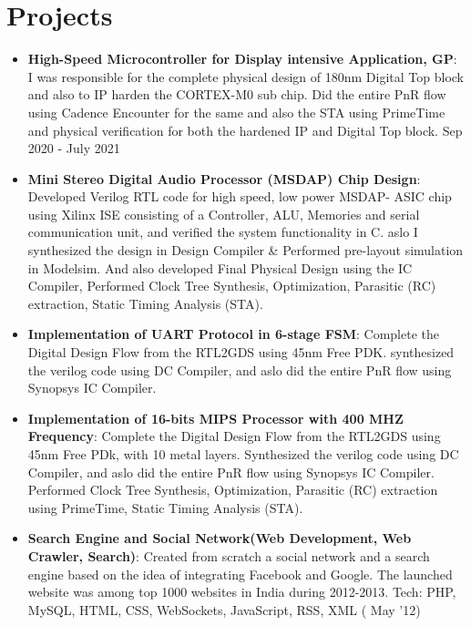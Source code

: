 \documentclass[a4paper,20pt]{article}
\newcommand{\resumeItem}[2]{
  \item\small{
    \textbf{#1}{: #2 \vspace{-2pt}}
  }
}
\newcommand{\resumeSubItem}[2]{\resumeItem{#1}{#2}\vspace{-3pt}}
\newcommand{\resumeSubHeadingListStart}{\begin{itemize}[leftmargin=*]}
\newcommand{\resumeSubHeadingListEnd}{\end{itemize}}
\begin{document}
\vspace{-5pt}
\section{Projects}
\resumeSubHeadingListStart
\resumeSubItem{High-Speed Microcontroller for Display intensive Application, GP}{I was responsible for the complete physical design of 180nm Digital Top block and also to IP harden the CORTEX-M0 sub chip. Did the entire PnR flow using Cadence Encounter for the same and also the STA using PrimeTime and physical verification for both the hardened IP and Digital Top block.} \hspace{13cm} {Sep 2020 - July 2021}
\vspace{2pt}
\resumeSubItem{Mini Stereo Digital Audio Processor (MSDAP) Chip Design}{Developed Verilog RTL code for high speed, low power MSDAP- ASIC chip using Xilinx ISE consisting of a Controller, ALU, Memories and serial communication unit, and verified the system functionality in C. aslo I synthesized the design in Design Compiler \& Performed pre-layout simulation in Modelsim. And also developed Final Physical Design using the IC Compiler, Performed Clock Tree Synthesis, Optimization, Parasitic (RC) extraction, Static Timing Analysis (STA).} \hspace{7.3cm}{Jan 2021 - Mar2021}
\vspace{2pt}
\resumeSubItem{Implementation of UART Protocol in 6-stage FSM}{Complete the Digital Design Flow from the RTL2GDS using 45nm Free PDK. synthesized the verilog code using DC Compiler, and aslo did the entire PnR flow using Synopsys IC Compiler.}
\vspace{2pt}
\resumeSubItem{Implementation of 16-bits MIPS Processor with 400 MHZ Frequency}{Complete the Digital Design Flow from the RTL2GDS using 45nm Free PDk, with 10 metal layers. Synthesized the verilog code using DC Compiler, and aslo did the entire PnR flow using Synopsys IC Compiler. Performed Clock Tree Synthesis, Optimization, Parasitic (RC) extraction using PrimeTime, Static Timing Analysis (STA).} \hspace{7.8cm}{Jan 2021 - Mar2021}
\vspace{2pt}
\resumeSubItem{Search Engine and Social Network(Web Development, Web Crawler, Search)}{Created from scratch a social network and a search engine based on the idea of integrating Facebook and Google. The launched website was among top 1000 websites in India during 2012-2013. Tech: PHP, MySQL, HTML, CSS, WebSockets, JavaScript, RSS, XML ( May '12)}
\resumeSubHeadingListEnd
\vspace{-5pt}
\end{document}
